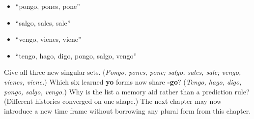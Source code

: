 \begin{itemize}
\raggedright
  \item “pongo, pones, pone”
  \item “salgo, sales, sale”
  \item “vengo, vienes, viene”
  \item “tengo, hago, digo, pongo, salgo, vengo”
\end{itemize}

\begin{tcolorbox}[breakable,colback=teal!4,colframe=teal!35!black,title={Before you move on}]
Give all three new singular sets. (\emph{Pongo, pones, pone; salgo, sales, sale; vengo, vienes, viene.}) Which six learned \textbf{yo} forms now share \textbf{-go}? (\emph{Tengo, hago, digo, pongo, salgo, vengo.}) Why is the list a memory aid rather than a prediction rule? (Different histories converged on one shape.) The next chapter may now introduce a new time frame without borrowing any plural form from this chapter.
\end{tcolorbox}
